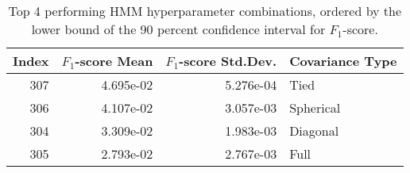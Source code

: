 \begin{table}
\caption{Top 4 performing HMM hyperparameter combinations, ordered by the lower bound of the 90 percent confidence interval for $F_1$-score.}
\label{tab:05_best_hmm_hpars}
\begin{tabular}{rrrl}
\toprule
Index & $F_1$-score Mean & $F_1$-score Std.Dev. & Covariance Type \\
\midrule
307 & 4.695e-02 & 5.276e-04 & Tied \\
306 & 4.107e-02 & 3.057e-03 & Spherical \\
304 & 3.309e-02 & 1.983e-03 & Diagonal \\
305 & 2.793e-02 & 2.767e-03 & Full \\
\bottomrule
\end{tabular}
\end{table}
